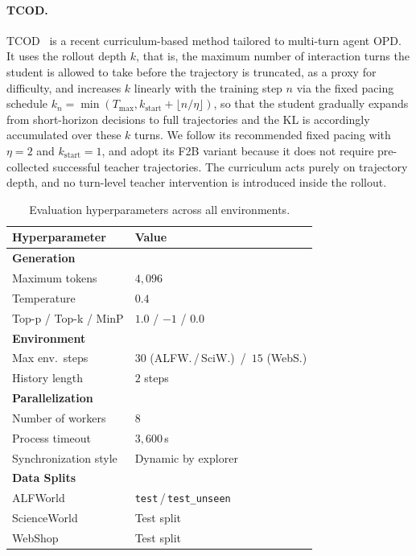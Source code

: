 \documentclass[11pt]{article}
\begin{document}
\paragraph{TCOD.}
TCOD~\citep{wang2026tcod} is a recent curriculum-based method tailored to multi-turn agent OPD. It uses the rollout depth $k$, that is, the maximum number of interaction turns the student is allowed to take before the trajectory is truncated, as a proxy for difficulty, and increases $k$ linearly with the training step $n$ via the fixed pacing schedule $k_n = \min(T_{\max}, k_{\text{start}} + \lfloor n / \eta \rfloor)$, so that the student gradually expands from short-horizon decisions to full trajectories and the KL is accordingly accumulated over these $k$ turns. 
We follow its recommended fixed pacing with $\eta = 2$ and $k_{\text{start}} = 1$, and adopt its F2B variant because it does not require pre-collected successful teacher trajectories. The curriculum acts purely on trajectory depth, and no turn-level teacher intervention is introduced inside the rollout.

\begin{table}[t]
\centering
\caption{Evaluation hyperparameters across all environments.}
\label{tab:eval_params}
\small
\setlength{\tabcolsep}{2.6pt}
\begin{tabular}{ll}
\toprule
\textbf{Hyperparameter} & \textbf{Value} \\
\midrule
\textbf{Generation} & \\
\quad Maximum tokens & $4{,}096$ \\
\quad Temperature & $0.4$ \\
\quad Top-p / Top-k / MinP & $1.0$ / $-1$ / $0.0$ \\
\midrule
\textbf{Environment} & \\
\quad Max env.\ steps & $30$ (ALFW.\,/\,SciW.) \,/\, $15$ (WebS.) \\
\quad History length & $2$ steps \\
\midrule
\textbf{Parallelization} & \\
\quad Number of workers & $8$ \\
\quad Process timeout & $3{,}600$\,s \\
\quad Synchronization style & Dynamic by explorer \\
\midrule
\textbf{Data Splits} & \\
\quad ALFWorld & \texttt{test}\,/\,\texttt{test\_unseen} \\
\quad ScienceWorld & Test split \\
\quad WebShop & Test split \\
\bottomrule
\end{tabular}
\end{table}
\end{document}
